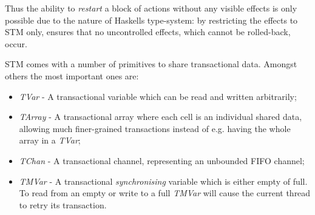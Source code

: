 Thus the ability to \textit{restart} a block of actions without any visible effects is only possible due to the nature of Haskells type-system: by restricting the effects to STM only, ensures that no uncontrolled effects, which cannot be rolled-back, occur.

STM comes with a number of primitives to share transactional data. Amongst others the most important ones are:

\begin{itemize}
	\item \textit{TVar} - A transactional variable which can be read and written arbitrarily;
	\item \textit{TArray} - A transactional array where each cell is an individual shared data, allowing much finer-grained transactions instead of e.g. having the whole array in a \textit{TVar};
	\item \textit{TChan} - A transactional channel, representing an unbounded FIFO channel;
	\item \textit{TMVar} - A transactional \textit{synchronising} variable which is either empty of full. To read from an empty or write to a full \textit{TMVar} will cause the current thread to retry its transaction.
\end{itemize}


